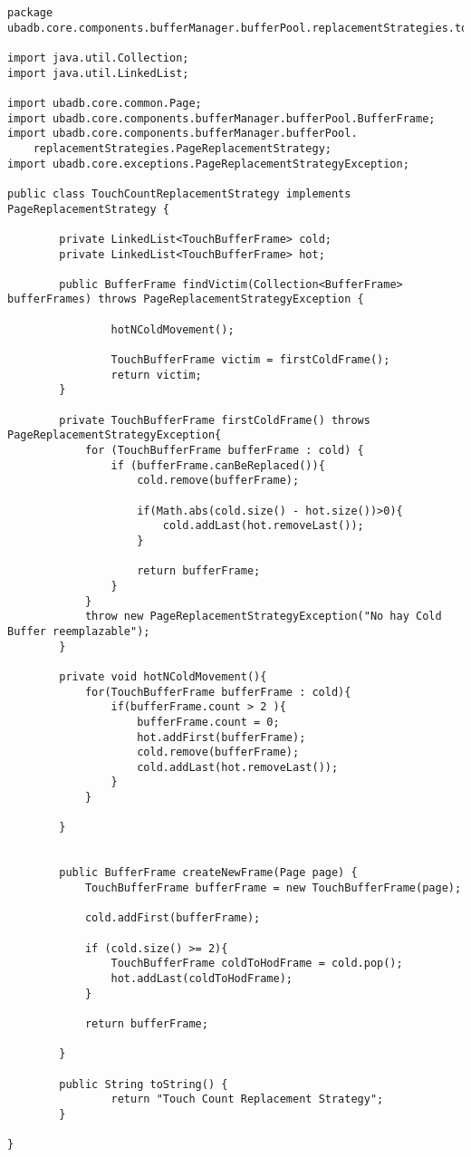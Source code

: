 \begin{lstlisting}
package ubadb.core.components.bufferManager.bufferPool.replacementStrategies.touchcount;

import java.util.Collection;
import java.util.LinkedList;

import ubadb.core.common.Page;
import ubadb.core.components.bufferManager.bufferPool.BufferFrame;
import ubadb.core.components.bufferManager.bufferPool.
	replacementStrategies.PageReplacementStrategy;
import ubadb.core.exceptions.PageReplacementStrategyException;

public class TouchCountReplacementStrategy implements PageReplacementStrategy {

		private LinkedList<TouchBufferFrame> cold;
		private LinkedList<TouchBufferFrame> hot;
	
        public BufferFrame findVictim(Collection<BufferFrame> bufferFrames) throws PageReplacementStrategyException {
       		
        		hotNColdMovement();
        		
        		TouchBufferFrame victim = firstColdFrame();
                return victim;
        }
        
        private TouchBufferFrame firstColdFrame() throws PageReplacementStrategyException{
        	for (TouchBufferFrame bufferFrame : cold) {
        		if (bufferFrame.canBeReplaced()){
        			cold.remove(bufferFrame);
        			
        			if(Math.abs(cold.size() - hot.size())>0){ 
        				cold.addLast(hot.removeLast());
        			}
        			
        			return bufferFrame;
        		}
        	}
        	throw new PageReplacementStrategyException("No hay Cold Buffer reemplazable");
        }
        
        private void hotNColdMovement(){
        	for(TouchBufferFrame bufferFrame : cold){
        		if(bufferFrame.count > 2 ){ 
        			bufferFrame.count = 0;
        			hot.addFirst(bufferFrame);
        			cold.remove(bufferFrame);
        			cold.addLast(hot.removeLast()); 
        		}
        	}
        	
        }
        

        public BufferFrame createNewFrame(Page page) {
        	TouchBufferFrame bufferFrame = new TouchBufferFrame(page);
        	
        	cold.addFirst(bufferFrame);
        	
        	if (cold.size() >= 2){ 
        		TouchBufferFrame coldToHodFrame = cold.pop();
        		hot.addLast(coldToHodFrame);
        	}
        	
        	return bufferFrame;     
        	
        }
        
        public String toString() {
                return "Touch Count Replacement Strategy";
        }
        
}
\end{lstlisting}
